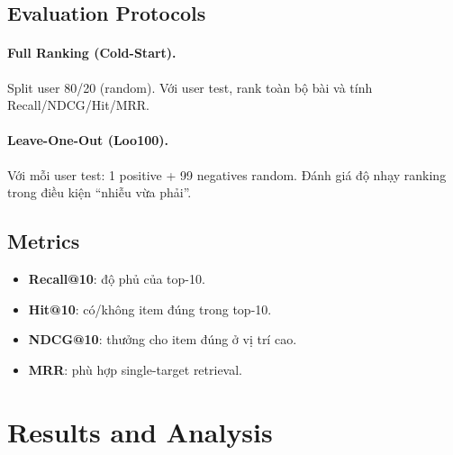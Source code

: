 \documentclass[11pt]{article}
\begin{document}
\subsection{Evaluation Protocols}
\paragraph{Full Ranking (Cold-Start).}
Split user 80/20 (random). Với user test, rank toàn bộ bài và tính Recall/NDCG/Hit/MRR.

\paragraph{Leave-One-Out (Loo100).}
Với mỗi user test: 1 positive + 99 negatives random. Đánh giá độ nhạy ranking trong điều kiện ``nhiễu vừa phải''.

\subsection{Metrics}
\begin{itemize}
  \item \textbf{Recall@10}: độ phủ của top-10.
  \item \textbf{Hit@10}: có/không item đúng trong top-10.
  \item \textbf{NDCG@10}: thưởng cho item đúng ở vị trí cao.
  \item \textbf{MRR}: phù hợp single-target retrieval.
\end{itemize}

\section{Results and Analysis}
\label{sec:results}
\end{document}

